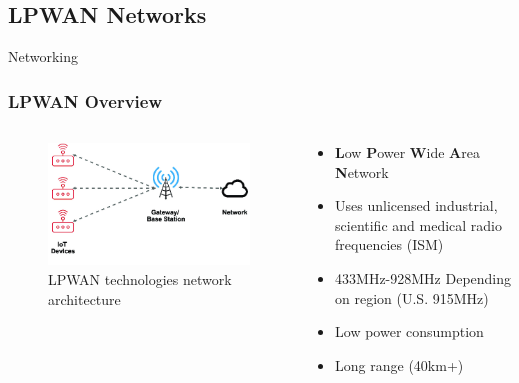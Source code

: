 \documentclass{beamer}
\begin{document}
\subsection{LPWAN Networks}

  \begin{frame}{Networking}
    \frametitle{LPWAN Overview}
    \begin{columns}
      \begin{column}{0.4\textwidth}
        \begin{figure}[htbp]
          \centering
          \includegraphics[width=\textwidth]{LPWAN-technologies-network-architecture.png}
          \caption{LPWAN technologies network architecture \cite{LoRaNetworkFernandez}}
          \label{fig:LPWAN_Network_architecture}
        \end{figure}
      \end{column}
      \begin{column}{0.6\textwidth}
        \begin{itemize}
          \item \textbf{L}ow \textbf{P}ower \textbf{W}ide \textbf{A}rea \textbf{N}etwork
          \item Uses unlicensed industrial, scientific and medical radio frequencies (ISM)
          \item 433MHz-928MHz Depending on region (U.S. 915MHz)
          \item Low power consumption
          \item Long range (40km+)
        \end{itemize}
      \end{column}
    \end{columns}
  \end{frame}
\end{document}
